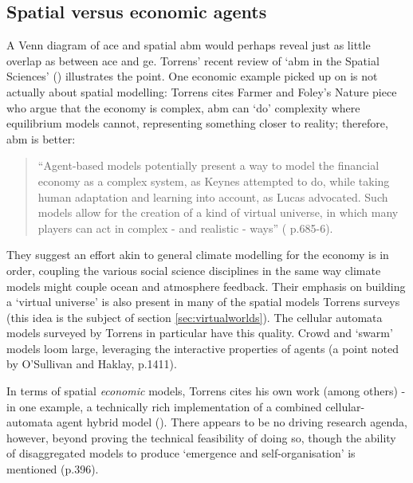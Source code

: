 \subsection{Spatial versus economic agents}

A Venn diagram of \gls{ace} and spatial \gls{abm} would perhaps reveal just as little overlap as between \gls{ace} and \gls{ge}.  Torrens' recent review of `\gls{abm} in the Spatial Sciences' (\citeyear{torrens_agent-based_2010}) illustrates the point. One economic example picked up on is not actually about spatial modelling: Torrens cites Farmer and Foley's Nature piece who argue that the economy is complex, \gls{abm} can `do' complexity where equilibrium models cannot, representing something closer to reality; therefore, \gls{abm} is better:

\begin{quote}
``Agent-based models potentially present a way to model the financial economy as a complex system, as Keynes attempted to do, while taking human adaptation and learning into account, as Lucas advocated. Such models allow for the creation of a kind of virtual universe, in which many players can act in complex - and realistic - ways'' (\citealt{farmer_economy_2009} p.685-6).
\end{quote}

They suggest an effort akin to general climate modelling for the economy is in order, coupling the various social science disciplines in the same way climate models might couple ocean and atmosphere feedback. Their emphasis on  building a `virtual universe' is also present in many of the spatial models Torrens surveys (this idea is the subject of section \ref{sec:virtualworlds}). The cellular automata models surveyed by Torrens in particular have this quality. Crowd and `swarm' models loom large, leveraging the interactive properties of agents (a point noted by O'Sullivan and Haklay, \citeyear{osullivan_agent-based_2000} p.1411). 

In terms of spatial \emph{economic} models, Torrens cites his own work (among others)  - in one example, a technically rich implementation of a combined cellular-automata agent hybrid model (\citealt{torrens_geographic_2005}). There appears to be no driving research agenda, however, beyond proving the technical feasibility of doing so, though the ability of disaggregated models to produce `emergence and self-organisation' is mentioned (p.396).

